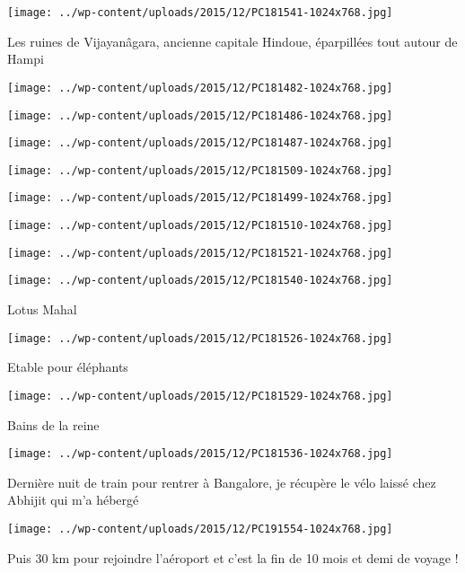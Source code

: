  \newline
\centerline{\texttt{[image: ../wp-content/uploads/2015/12/PC181541-1024x768.jpg]} } 
 \newline
 Les ruines de Vijayanâgara, ancienne capitale Hindoue, éparpillées tout autour de Hampi \newline
 \newline
\centerline{\texttt{[image: ../wp-content/uploads/2015/12/PC181482-1024x768.jpg]} } 
 \newline
 \newline
\centerline{\texttt{[image: ../wp-content/uploads/2015/12/PC181486-1024x768.jpg]} } 
 \newline
 \newline
\centerline{\texttt{[image: ../wp-content/uploads/2015/12/PC181487-1024x768.jpg]} } 
 \newline
 \newline
\centerline{\texttt{[image: ../wp-content/uploads/2015/12/PC181509-1024x768.jpg]} } 
 \newline
 \newline
\centerline{\texttt{[image: ../wp-content/uploads/2015/12/PC181499-1024x768.jpg]} } 
 \newline
 \newline
\centerline{\texttt{[image: ../wp-content/uploads/2015/12/PC181510-1024x768.jpg]} } 
 \newline
 \newline
\centerline{\texttt{[image: ../wp-content/uploads/2015/12/PC181521-1024x768.jpg]} } 
 \newline
 \newline
\centerline{\texttt{[image: ../wp-content/uploads/2015/12/PC181540-1024x768.jpg]} } 
 \newline
 Lotus Mahal \newline
 \newline
\centerline{\texttt{[image: ../wp-content/uploads/2015/12/PC181526-1024x768.jpg]} } 
 \newline
 Etable pour éléphants \newline
 \newline
\centerline{\texttt{[image: ../wp-content/uploads/2015/12/PC181529-1024x768.jpg]} } 
 \newline
 Bains de la reine \newline
 \newline
\centerline{\texttt{[image: ../wp-content/uploads/2015/12/PC181536-1024x768.jpg]} } 
 \newline
 Dernière nuit de train pour rentrer à Bangalore, je récupère le vélo laissé chez Abhijit qui m'a hébergé \newline
 \newline
\centerline{\texttt{[image: ../wp-content/uploads/2015/12/PC191554-1024x768.jpg]} } 
 \newline
 Puis 30 km pour rejoindre l'aéroport et c'est la fin de 10 mois et demi de voyage ! \newline

\newpage
 
